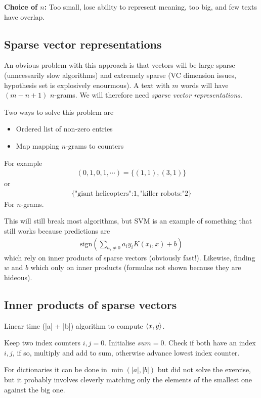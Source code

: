 \documentclass{article}
\begin{document}
      \textbf{Choice of $n$:} Too small, lose ability to represent meaning, too big, and few texts have overlap. 

    \subsection{Sparse vector representations}
      An obvious problem with this approach is that vectors will be large sparse (unncessarily slow algorithms) and extremely sparse (VC dimension issues, hypothesis set is explosively enourmous). A text with $m$ words will have $(m-n+1)$ $n$-grams. We will therefore need \emph{sparse vector representations}.

      Two ways to solve this problem are
      \begin{itemize}
        \item Ordered list of non-zero entries
        \item Map mapping $n$-grams to counters
      \end{itemize}
      For example 
      \begin{align}
        (0, 1, 0, 1, \cdots) = \{(1, 1), (3, 1)\}
      \end{align}
      or 
      \begin{align}
        \{\text{"giant helicopters":}1, \text{"killer robots:"}2\}
      \end{align}
      For $n$-grams. 

      This will still break most algorithms, but SVM is an example of something that still works because predictions are 
      \begin{align}
        \text{sign}(
          \sum_{a_i \neq 0}{a_i y_i K(x_i, x)+b}
        )
      \end{align}
      which rely on inner products of sparse vectors (obviously fast!). Likewise, finding $w$ and $b$ which only on inner products (formulas not shown because they are hideous).

      \subsection{Inner products of sparse vectors}
        Linear time (|a| + |b|) algorithm to compute $\langle x, y\rangle$.

        Keep two index counters $i, j = 0$. Initialise $sum = 0$. Check if both have an index $i, j$, if so, multiply and add to sum, otherwise advance lowest index counter. 

        For dictionaries it can be done in $\min(|a|, |b|)$ but did not solve the exercise, but it probably involves cleverly matching only the elements of the smallest one against the big one.
\end{document}
